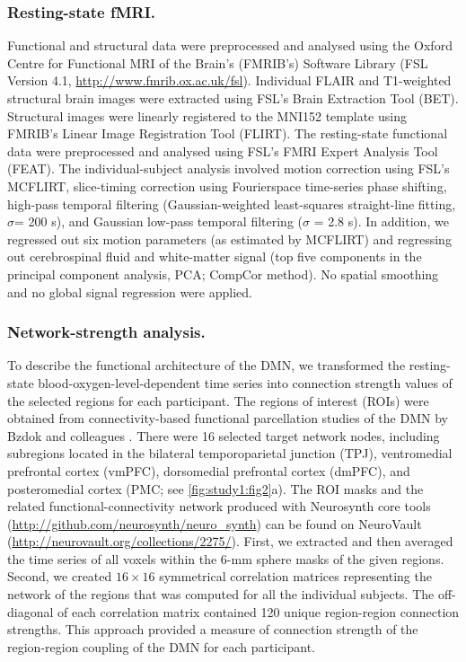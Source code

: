 \subsubsection{Resting-state fMRI.}

Functional and structural data were preprocessed and analysed using the Oxford Centre for Functional MRI of the Brain’s (FMRIB’s) Software Library (FSL Version 4.1, \url{http://www.fmrib.ox.ac.uk/fsl}).
Individual FLAIR and T1-weighted structural brain images were extracted using FSL’s Brain Extraction Tool (BET). Structural images were linearly registered to the MNI152 template using FMRIB’s Linear Image Registration Tool (FLIRT). The resting-state functional data were preprocessed and analysed using FSL's FMRI Expert Analysis Tool (FEAT). The individual-subject analysis involved motion correction using FSL’s MCFLIRT, slice-timing correction using Fourierspace time-series phase shifting, high-pass temporal filtering (Gaussian-weighted least-squares straight-line fitting, \(\sigma\)= 200 s), and Gaussian low-pass temporal filtering (\(\sigma\) = 2.8 s). In addition, we regressed out six motion parameters (as estimated by MCFLIRT) and regressing out cerebrospinal fluid and white-matter signal (top five components in the principal component analysis, PCA; CompCor method). No spatial smoothing and no global signal regression were applied.

\subsubsection{Network-strength analysis.}

To describe the functional architecture of the DMN, we transformed the resting-state blood-oxygen-level-dependent time series into connection strength values of the selected regions for each participant. The regions of interest (ROIs) were obtained from connectivity-based functional parcellation studies of the DMN by Bzdok and colleagues
\cite{BzdokNI2013,Bzdok2015,Bzdok2016,Eickhoff2016,Eickhoff2016}.
There were 16 selected target network nodes, including subregions located in the bilateral temporoparietal junction (TPJ), ventromedial prefrontal cortex (vmPFC), dorsomedial prefrontal cortex (dmPFC), and posteromedial cortex
(PMC; see \cref{fig:study1:fig2}a).
The ROI masks and the related functional-connectivity network produced with Neurosynth core tools
(\url{http://github.com/neurosynth/neuro_synth})
can be found on NeuroVault
(\url{http://neurovault.org/collections/2275/}). First, we extracted and then averaged the time series of all voxels within the 6-mm sphere masks of the given regions. Second, we created \(16\times16\) symmetrical correlation matrices representing the network of the regions that was computed for all the individual subjects. The off-diagonal of each correlation matrix contained 120 unique region-region connection strengths. This approach provided a measure of connection strength of the region-region coupling of the DMN for each participant.

